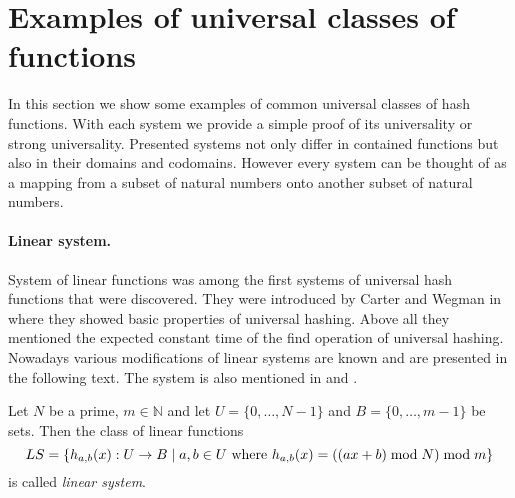 \section{Examples of universal classes of functions}
In this section we show some examples of common universal classes of hash functions. With each system we provide a simple proof of its universality or strong universality. Presented systems not only differ in contained functions but also in their domains and codomains. However every system can be thought of as a mapping from a subset of natural numbers onto another subset of natural numbers.

\paragraph{Linear system.}
System of linear functions was among the first systems of universal hash functions that were discovered. They were introduced by Carter and Wegman in \cite{DBLP:journals/jcss/CarterW79} where they showed basic properties of universal hashing. Above all they mentioned the expected constant time of the find operation of universal hashing. Nowadays various modifications of linear systems are known and are presented in the following text. The system is also mentioned in \cite{VK-skripta} and \cite{DBLP:books/sp/MehlhornS2008}.

\begin{definition}
\label{definition-linear-system}
Let $N$ be a prime, $m \in \mathbb{N}$ and let $U = \{0, \dots, N - 1 \}$ and $B = \{0, \dots, m - 1\}$ be sets. Then the class of linear functions 
\[ LS = \{h_{a, b}(x): U \rightarrow B \mid a, b \in U \text{ where } h_{a, b}(x) = ((ax + b) \bmod N) \bmod m \} \]
is called \emph{linear system}.
\end{definition}

